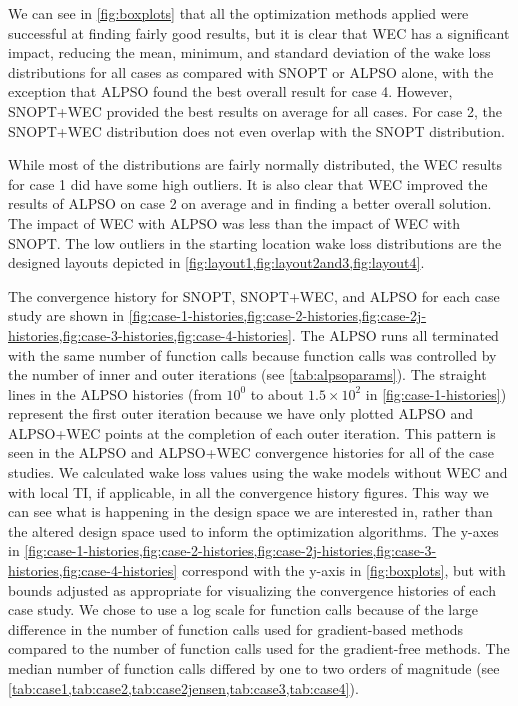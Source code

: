 \documentclass[hidelinks,sort&compress,AMA,STIX1COL]{WileyNJD-v2}
\begin{document}
We can see in \cref{fig:boxplots} that all the optimization methods applied were successful at finding fairly good results, but it is clear that WEC has a significant impact, reducing the mean, minimum, and standard deviation of the wake loss distributions for all cases as compared with SNOPT or ALPSO alone, with the exception that ALPSO found the best overall result for case 4. However, SNOPT+WEC  provided the best results on average for all cases. For case 2, the SNOPT+WEC distribution does not even overlap with the SNOPT distribution. 

While most of the distributions are fairly normally distributed, the WEC results for case 1 did have some high outliers. It is also clear that WEC improved the results of ALPSO on case 2 on average and in finding a better overall solution. The impact of WEC with ALPSO was less than the impact of WEC with SNOPT. The low outliers in the starting location wake loss distributions are the designed layouts depicted in \cref{fig:layout1,fig:layout2and3,fig:layout4}.

The convergence history for SNOPT, SNOPT+WEC, and ALPSO for each case study are shown in \cref{fig:case-1-histories,fig:case-2-histories,fig:case-2j-histories,fig:case-3-histories,fig:case-4-histories}. The ALPSO runs all terminated with the same number of function calls because function calls was controlled by the number of inner and outer iterations (see \cref{tab:alpsoparams}). The straight lines in the ALPSO histories (from $10^0$ to about $1.5\times10^2$ in \cref{fig:case-1-histories}) represent the first outer iteration because we have only plotted ALPSO and ALPSO+WEC points at the completion of each outer iteration. This pattern is seen in the ALPSO and ALPSO+WEC convergence histories for all of the case studies. 
We calculated wake loss values using the wake models without WEC and with local TI, if applicable, in all the convergence history figures. This way we can see what is happening in the design space we are interested in, rather than the altered design space used to inform the optimization algorithms. The y-axes in \cref{fig:case-1-histories,fig:case-2-histories,fig:case-2j-histories,fig:case-3-histories,fig:case-4-histories} correspond with the y-axis in \cref{fig:boxplots}, but with bounds adjusted as appropriate for visualizing the convergence histories of each case study. We chose to use a log scale for function calls because of the large difference in the number of function calls used for gradient-based methods compared to the number of function calls used for the gradient-free methods. The median number of function calls differed by one to two orders of magnitude (see \cref{tab:case1,tab:case2,tab:case2jensen,tab:case3,tab:case4}).
\end{document}
